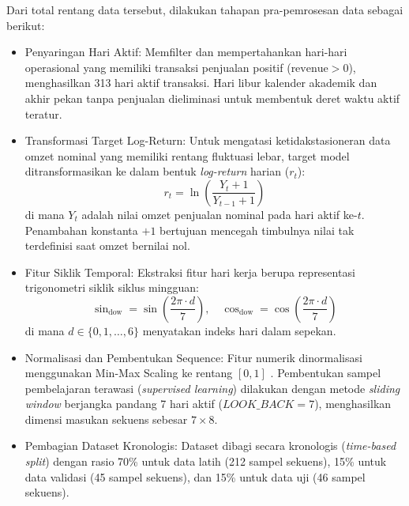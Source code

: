 \documentclass[10pt,a4paper]{article}
\begin{document}
Dari total rentang data tersebut, dilakukan tahapan pra-pemrosesan data sebagai berikut:
\begin{itemize}
  \item Penyaringan Hari Aktif: Memfilter dan mempertahankan hari-hari operasional yang memiliki transaksi penjualan positif ($\text{revenue} > 0$), menghasilkan 313 hari aktif transaksi. Hari libur kalender akademik dan akhir pekan tanpa penjualan dieliminasi untuk membentuk deret waktu aktif teratur.
  \item Transformasi Target Log-Return: Untuk mengatasi ketidakstasioneran data omzet nominal yang memiliki rentang fluktuasi lebar, target model ditransformasikan ke dalam bentuk \textit{log-return} harian ($r_t$):
  \begin{equation}
    r_t = \ln\left(\frac{Y_t + 1}{Y_{t-1} + 1}\right)
    \label{eq:log_return}
  \end{equation}
  di mana $Y_t$ adalah nilai omzet penjualan nominal pada hari aktif ke-$t$. Penambahan konstanta $+1$ bertujuan mencegah timbulnya nilai tak terdefinisi saat omzet bernilai nol.
  \item Fitur Siklik Temporal: Ekstraksi fitur hari kerja berupa representasi trigonometri siklik siklus mingguan:
  \begin{equation}
    \sin_{\text{dow}} = \sin\left(\frac{2\pi \cdot d}{7}\right), \quad \cos_{\text{dow}} = \cos\left(\frac{2\pi \cdot d}{7}\right)
    \label{eq:dow}
  \end{equation}
  di mana $d \in \{0, 1, \dots, 6\}$ menyatakan indeks hari dalam sepekan.
  \item Normalisasi dan Pembentukan Sequence: Fitur numerik dinormalisasi menggunakan Min-Max Scaling ke rentang $[0, 1]$ \cite{pedregosa2011scikit}. Pembentukan sampel pembelajaran terawasi (\textit{supervised learning}) dilakukan dengan metode \textit{sliding window} berjangka pandang 7 hari aktif ($LOOK\_BACK=7$), menghasilkan dimensi masukan sekuens sebesar $7 \times 8$.
  \item Pembagian Dataset Kronologis: Dataset dibagi secara kronologis (\textit{time-based split}) dengan rasio 70\% untuk data latih (212 sampel sekuens), 15\% untuk data validasi (45 sampel sekuens), dan 15\% untuk data uji (46 sampel sekuens).
\end{itemize}
\end{document}
